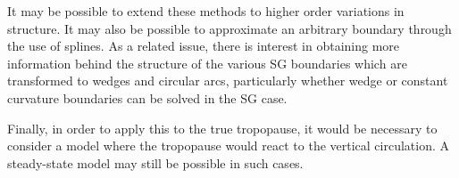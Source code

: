 \documentclass[11pt,onecolumn,oneside]{article}
\begin{document}
It may be possible to extend these methods to higher order variations in structure. It may also be possible to approximate an arbitrary boundary through the use of splines. As a related issue, there is interest in obtaining more information behind the structure of the various SG boundaries which are transformed to wedges and circular arcs, particularly whether wedge or constant curvature boundaries can be solved in the SG case. 

Finally, in order to apply this to the true tropopause, it would be necessary to consider a model where the tropopause would react to the vertical circulation. A steady-state model may still be possible in such cases.



\end{document}

